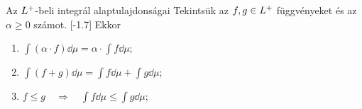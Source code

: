 \documentclass[
]{elteikthesis}[2024/04/26]
\begin{document}
	\begin{theorem}{Az \( L^+ \)-beli integrál alaptulajdonságai}{}
		Tekintsük az \( f, g \in L^+ \) függvényeket és az \( \alpha \geq 0 \) számot. 
		[-1.7\baselineskip]
		Ekkor
		\begin{enumerate}
			\item \( \displaystyle \int (\alpha \cdot f) \dd{\mu} = \alpha \cdot \int f \dd{\mu} \);
			\item \( \displaystyle \int (f + g) \dd{\mu} = \int f \dd{\mu} + \int g \dd{\mu} \);
			\item \( \displaystyle f \leq g \quad \Longrightarrow \quad \int f \dd{\mu} \leq \int g \dd{\mu} \);
		\end{enumerate}
	\end{theorem}
	
\end{document}

